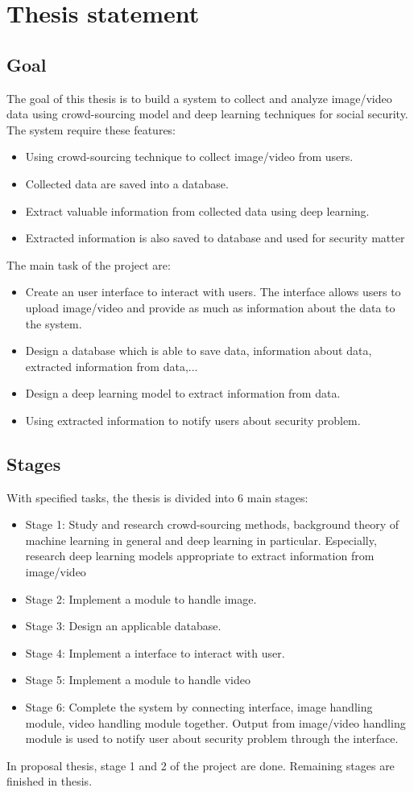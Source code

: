 \section{Thesis statement}
\subsection{Goal}
The goal of this thesis is to build a system to collect and analyze image/video data using crowd-sourcing model and deep learning techniques for social security. The system require these features:
\begin{itemize}
	\item Using crowd-sourcing technique to collect image/video from users.
	\item Collected data are saved into a database.
	\item Extract valuable information from collected data using deep learning.
	\item Extracted information is also saved to database and used for security matter
\end{itemize} 
The main task of the project are:
\begin{itemize}
	\item Create an user interface to interact with users. The interface allows users to upload image/video and provide as much as information about the data to the system.
	\item Design a database which is able to save data, information about data, extracted information from data,...
	\item Design a deep learning model to extract information from data.
	\item Using extracted information to notify users about security problem.
\end{itemize} 

\subsection{Stages}
With specified tasks, the thesis is divided into 6 main stages:
\begin{itemize}
	\item Stage 1: Study and research crowd-sourcing methods, background theory of machine learning in general and deep learning in particular. Especially, research deep learning models appropriate to extract information from image/video
	\item Stage 2: Implement a module to handle image. 
	\item Stage 3: Design an applicable database.
	\item Stage 4: Implement a interface to interact with user.
	\item Stage 5: Implement a module to handle video
	\item Stage 6: Complete the system by connecting interface, image handling module, video handling module together. Output from image/video handling module is used to notify user about security problem through the interface.
\end{itemize} 
In proposal thesis, stage 1 and 2 of the project are done. Remaining stages are finished in thesis.  
